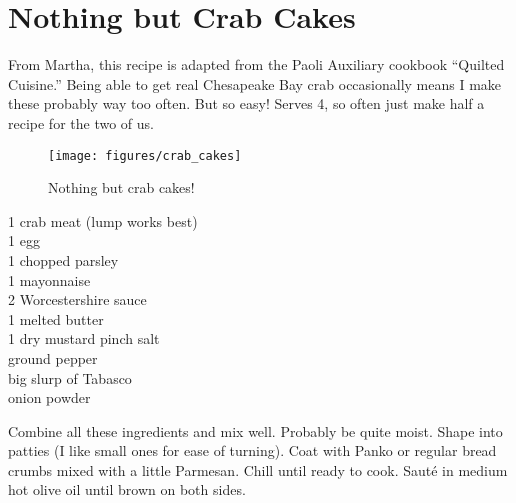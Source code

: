 \section{Nothing but Crab Cakes}

\begin{open}
    From Martha, this recipe is adapted from the Paoli Auxiliary cookbook
    ``Quilted Cuisine.'' Being able to get real Chesapeake Bay crab
    occasionally means I make these probably way too often. But so easy! Serves
    4, so often just make half a recipe for the two of us.
\end{open}
\begin{figure}[h]
    \centering
    \texttt{[image: figures/crab\_cakes]}
    \caption*{Nothing but crab cakes!}
\end{figure}
\begin{ingredients}
    \SI{1}{\pound} crab meat (lump works best)\\
    1 egg\\
    \SI{1}{\tblspoon} chopped parsley\\
    \SI{1}{\tblspoon} mayonnaise\\
    \SI{2}{\teaspoon} Worcestershire sauce\\
    \SI{1}{\tblspoon} melted butter\\
    \SI{1}{\teaspoon} dry mustard
    pinch salt\\
    ground pepper\\
    big slurp of Tabasco\\
    onion powder\\
\end{ingredients}
Combine all these ingredients and mix well. Probably be quite moist. Shape into
patties (I like small ones for ease of turning). Coat with Panko or regular
bread crumbs mixed with a little Parmesan. Chill until ready to cook. Sauté in
medium hot olive oil until brown on both sides.